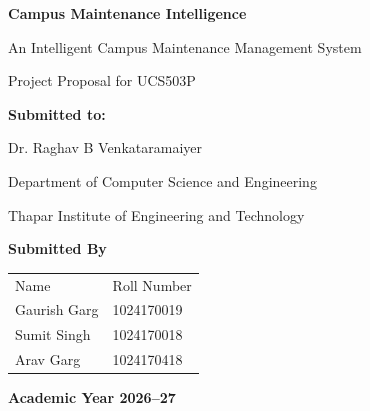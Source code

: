 \documentclass[12pt,a4paper]{article}
\begin{document}

\begin{titlepage}

\begin{center}

\vspace*{1.2cm}

{\Huge \textbf{Campus Maintenance Intelligence}}

\vspace{0.4cm}

{\Large An Intelligent Campus Maintenance Management System}

\vspace{1cm}

{\large Project Proposal for UCS503P}

\vspace{1cm}

\textbf{Submitted to:}

\vspace{0.2cm}

Dr. Raghav B Venkataramaiyer

\vspace{0.2cm}

Department of Computer Science and Engineering

\vspace{0.2cm}

Thapar Institute of Engineering and Technology

\vspace{1cm}

\textbf{Submitted By}

\vspace{0.4cm}

\begin{tabular}{ll}
Name & Roll Number \\
Gaurish Garg & 1024170019 \\
Sumit Singh & 1024170018 \\
Arav Garg & 1024170418
\end{tabular}

\vfill

\textbf{Academic Year 2026--27}

\end{center}

\end{titlepage}

\end{document}
